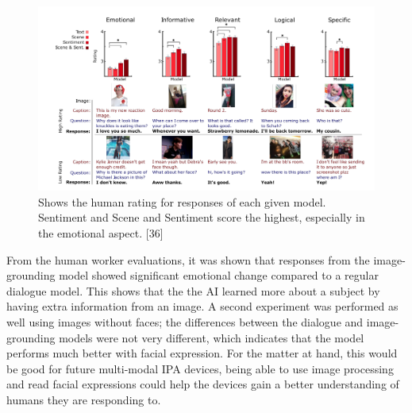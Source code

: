 \documentclass[letterpaper, 10 pt, conference]{IEEEtran}
\begin{document}
\begin{figure}
\renewcommand\figurename{Fig.}
\centering
\includegraphics[width=\textwidth]{stats}
\caption{Shows the human rating for responses of each given model. Sentiment and Scene and Sentiment score the highest, especially in the emotional aspect. [36]}
\end{figure} 

\par From the human worker evaluations, it was shown that responses from the image-grounding model showed significant emotional change compared to a regular dialogue model. This shows that the the AI learned more about a subject by having extra information from an image. A second experiment was performed as well using images without faces; the differences between the dialogue and image-grounding models were not very different, which indicates that the model performs much better with facial expression. For the matter at hand, this would be good for future multi-modal IPA devices, being able to use image processing and read facial expressions could help the devices gain a better understanding of humans they are responding to.
\end{document}
